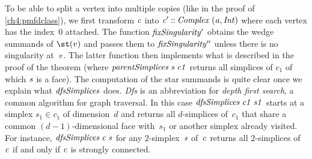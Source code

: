 \resethooks
To be able to split a vertex into multiple copies (like in the proof of
\cref{ch4:pmfdclass}), we first transform \ensuremath{\Varid{c}} into \ensuremath{\Varid{c'}\mathbin{::}\Conid{Complex}\;(\Varid{a},\Conid{Int})}
where each vertex has the index~$0$ attached. The function \ensuremath{\Varid{fixSingularity'}}
obtains the wedge summands of $\st(v)$ and passes them to \ensuremath{\Varid{fixSingularity''}}
unless there is no singularity at~\ensuremath{\Varid{v}}. The latter function then implements
what is described in the proof of the theorem (where \ensuremath{\Varid{parentSimplices}\;\Varid{s}\;\Varid{c1}}
returns all simplices of $c_1$ of which \ensuremath{\Varid{s}} is a face).
The computation of the star summands is quite clear once we explain what
\ensuremath{\Varid{dfsSimplices}} does. \emph{Dfs} is an abbreviation for \emph{depth first
search}, a common algorithm for graph traversal. In this case
\ensuremath{\Varid{dfsSimplices}\;\Varid{c1}\;\Varid{s1}} starts at a simplex $s_1\in c_1$ of dimension~$d$ and
returns all $d$-simplices of~$c_1$ that share a common $(d{-}1)$-dimensional face
with~$s_1$ or another simplex already visited. For instance, \ensuremath{\Varid{dfsSimplices}\;\Varid{c}\;\Varid{s}}
for any $2$-simplex~\ensuremath{\Varid{s}} of~\ensuremath{\Varid{c}} returns all $2$-simplices of~\ensuremath{\Varid{c}} if and only if
\ensuremath{\Varid{c}} is strongly connected.

